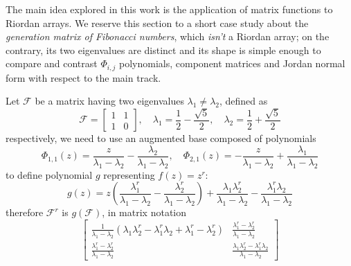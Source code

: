 
The main idea explored in this work is the application of matrix functions to
Riordan arrays. We reserve this section to a short case study about the
\textit{generation matrix of Fibonacci numbers}, which \textit{isn't} a Riordan
array; on the contrary, its two eigenvalues are distinct and its shape is
simple enough to compare and contrast $\Phi_{i,j}$ polynomials, component
matrices and Jordan normal form with respect to the main track.

Let $\mathcal{F}$ be a matrix having two eigenvalues $\lambda_{1}\neq
\lambda_{2}$, defined as
\begin{displaymath}
\mathcal{F} = \left[\begin{matrix}1 & 1\\1 & 0\end{matrix}\right],
\quad  \lambda_{1} =  \frac{1}{2}- \frac{\sqrt{5}}{2} ,
\quad \lambda_{2} = \frac{1}{2} + \frac{\sqrt{5}}{2}
\end{displaymath}
respectively, we need to use an augmented base composed of polynomials
\begin{displaymath}
 \Phi_{ 1, 1 }{\left (z \right )} = \frac{z}{\lambda_{1} - \lambda_{2}} - \frac{\lambda_{2}}{\lambda_{1} - \lambda_{2}}, \quad  \Phi_{ 2, 1 }{\left (z \right )} = - \frac{z}{\lambda_{1} - \lambda_{2}} + \frac{\lambda_{1}}{\lambda_{1} - \lambda_{2}}
\end{displaymath}
to define polynomial $g$ representing $f(z)=z^{r}$:
\begin{displaymath}
g{\left (z \right )} = z \left(\frac{\lambda_{1}^{r}}{\lambda_{1} - \lambda_{2}} - \frac{\lambda_{2}^{r}}{\lambda_{1} - \lambda_{2}}\right) + \frac{\lambda_{1} \lambda_{2}^{r}}{\lambda_{1} - \lambda_{2}} - \frac{\lambda_{1}^{r} \lambda_{2}}{\lambda_{1} - \lambda_{2}}
\end{displaymath}
therefore $\mathcal{F}^{r}$ is $g(\mathcal{F})$, in matrix notation
\begin{displaymath}
\left[\begin{matrix}\frac{1}{\lambda_{1} - \lambda_{2}} \left(\lambda_{1} \lambda_{2}^{r} - \lambda_{1}^{r} \lambda_{2} + \lambda_{1}^{r} - \lambda_{2}^{r}\right) & \frac{\lambda_{1}^{r} - \lambda_{2}^{r}}{\lambda_{1} - \lambda_{2}}\\\frac{\lambda_{1}^{r} - \lambda_{2}^{r}}{\lambda_{1} - \lambda_{2}} & \frac{\lambda_{1} \lambda_{2}^{r} - \lambda_{1}^{r} \lambda_{2}}{\lambda_{1} - \lambda_{2}}\end{matrix}\right]
\end{displaymath}

